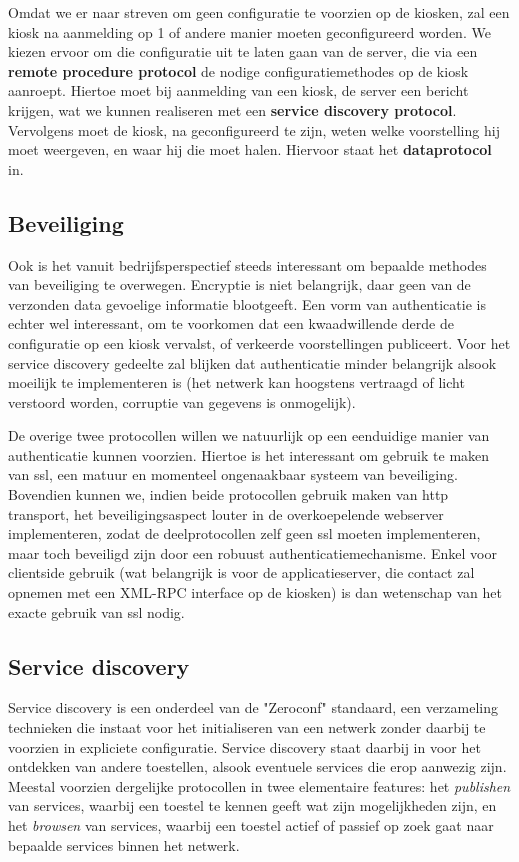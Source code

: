Omdat we er naar streven om geen configuratie te voorzien op de kiosken, zal een kiosk na aanmelding op 1 of andere manier moeten geconfigureerd worden. We kiezen ervoor om die configuratie uit te laten gaan van de server, die via een \textbf{remote procedure protocol} de nodige configuratiemethodes op de kiosk aanroept. Hiertoe moet bij aanmelding van een kiosk, de server een bericht krijgen, wat we kunnen realiseren met een \textbf{service discovery protocol}. Vervolgens moet de kiosk, na geconfigureerd te zijn, weten welke voorstelling hij moet weergeven, en waar hij die moet halen. Hiervoor staat het \textbf{dataprotocol} in.

\subsection{Beveiliging}

Ook is het vanuit bedrijfsperspectief steeds interessant om bepaalde methodes van beveiliging te overwegen. Encryptie is niet belangrijk, daar geen van de verzonden data gevoelige informatie blootgeeft. Een vorm van authenticatie is echter wel interessant, om te voorkomen dat een kwaadwillende derde de configuratie op een kiosk vervalst, of verkeerde voorstellingen publiceert. Voor het service discovery gedeelte zal blijken dat authenticatie minder belangrijk alsook moeilijk te implementeren is (het netwerk kan hoogstens vertraagd of licht verstoord worden, corruptie van gegevens is onmogelijk).

De overige twee protocollen willen we natuurlijk op een eenduidige manier van authenticatie kunnen voorzien. Hiertoe is het interessant om gebruik te maken van \ac{ssl}, een matuur en momenteel ongenaakbaar systeem van beveiliging. Bovendien kunnen we, indien beide protocollen gebruik maken van \ac{http} transport, het beveiligingsaspect louter in de overkoepelende webserver implementeren, zodat de deelprotocollen zelf geen \ac{ssl} moeten implementeren, maar toch beveiligd zijn door een robuust authenticatiemechanisme. Enkel voor clientside gebruik (wat belangrijk is voor de applicatieserver, die contact zal opnemen met een XML-RPC interface op de kiosken) is dan wetenschap van het exacte gebruik van \ac{ssl} nodig.

\subsection{Service discovery}

Service discovery is een onderdeel van de "Zeroconf" standaard, een verzameling technieken die instaat voor het initialiseren van een netwerk zonder daarbij te voorzien in expliciete configuratie. Service discovery staat daarbij in voor het ontdekken van andere toestellen, alsook eventuele services die erop aanwezig zijn. Meestal voorzien dergelijke protocollen in twee elementaire features: het \emph{publishen} van services, waarbij een toestel te kennen geeft wat zijn mogelijkheden zijn, en het \emph{browsen} van services, waarbij een toestel actief of passief op zoek gaat naar bepaalde services binnen het netwerk.


